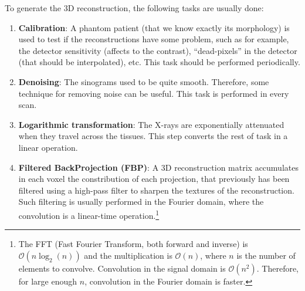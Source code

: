 To generate the 3D reconstruction, the following tasks are usually done:

\begin{enumerate}
\item \textbf{Calibration}: A phantom patient (that we know exactly
  its morphology) is used to test if the reconstructions have some
  problem, such as for example, the detector sensitivity (affects to
  the contrast), ``dead-pixels'' in the detector (that should be
  interpolated), etc. This task should be performed periodically.
\item \textbf{Denoising}: The sinograms used to be quite
  smooth. Therefore, some technique for removing noise can be
  useful. This task is performed in every scan.
\item \textbf{Logarithmic transformation}: The X-rays are
  exponentially attenuated when they travel across the tissues. This
  step converts the rest of task in a linear operation.
\item \textbf{Filtered BackProjection (FBP)}: A 3D reconstruction
  matrix accumulates in each voxel the constribution of each
  projection, that previously has been filtered using a high-pass
  filter to sharpen the textures of the reconstruction. Such filtering
  is usually performed in the Fourier domain, where the convolution is
  a linear-time operation.\footnote{The FFT (Fast Fourier Transform,
    both forward and inverse) is $\mathcal{O}(n\log_2(n))$ and the
    multiplication is $\mathcal{O}(n)$, where $n$ is the number of
    elements to convolve. Convolution in the signal domain is
    $\mathcal{O}(n^2)$. Therefore, for large enough $n$, convolution
    in the Fourier domain is faster.}
  

\end{enumerate}
